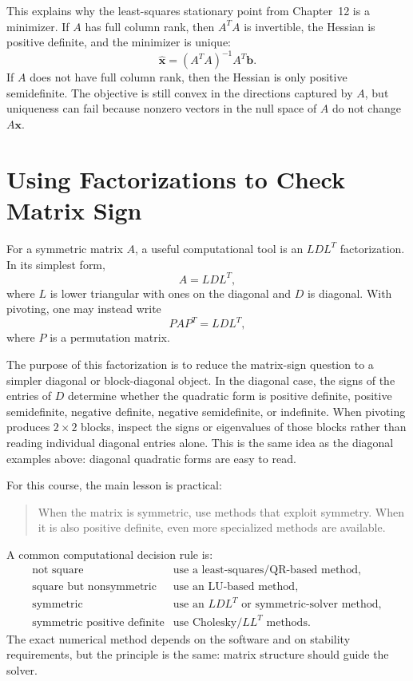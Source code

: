 This explains why the least-squares stationary point from Chapter~12 is a minimizer. If \(A\) has full column rank, then \(A^TA\) is invertible, the Hessian is positive definite, and the minimizer is unique:
\[
    \widehat{\mathbf{x}}
    =(A^TA)^{-1}A^T\mathbf{b}.
\]
If \(A\) does not have full column rank, then the Hessian is only positive semidefinite. The objective is still convex in the directions captured by \(A\), but uniqueness can fail because nonzero vectors in the null space of \(A\) do not change \(A\mathbf{x}\).

\section{Using Factorizations to Check Matrix Sign}
\label{mf:ldlt-factorization}

For a symmetric matrix \(A\), a useful computational tool is an \(LDL^T\) factorization. In its simplest form,
\[
    A=LDL^T,
\]
where \(L\) is lower triangular with ones on the diagonal and \(D\) is diagonal. With pivoting, one may instead write
\[
    P A P^T=LDL^T,
\]
where \(P\) is a permutation matrix.

The purpose of this factorization is to reduce the matrix-sign question to a simpler diagonal or block-diagonal object. In the diagonal case, the signs of the entries of \(D\) determine whether the quadratic form is positive definite, positive semidefinite, negative definite, negative semidefinite, or indefinite. When pivoting produces \(2\times2\) blocks, inspect the signs or eigenvalues of those blocks rather than reading individual diagonal entries alone. This is the same idea as the diagonal examples above: diagonal quadratic forms are easy to read.

For this course, the main lesson is practical:

\begin{quote}
    When the matrix is symmetric, use methods that exploit symmetry. When it is also positive definite, even more specialized methods are available.
\end{quote}

A common computational decision rule is:
\[
\begin{array}{ll}
\text{not square} & \text{use a least-squares/QR-based method},\\
\text{square but nonsymmetric} & \text{use an LU-based method},\\
\text{symmetric} & \text{use an } LDL^T \text{ or symmetric-solver method},\\
\text{symmetric positive definite} & \text{use Cholesky/}LL^T\text{ methods}.
\end{array}
\]
The exact numerical method depends on the software and on stability requirements, but the principle is the same: matrix structure should guide the solver.

